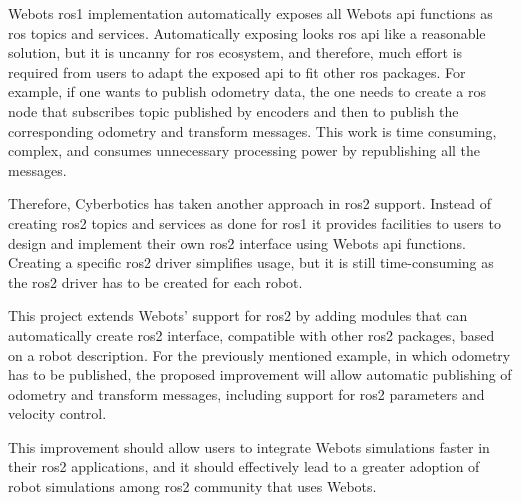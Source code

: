Webots \ac{ros}1 implementation automatically exposes all Webots \ac{api} functions as \ac{ros} topics and services.
Automatically exposing looks \ac{ros} \ac{api} like a reasonable solution, but it is uncanny for \ac{ros} ecosystem, and therefore, much effort is required from users to adapt the exposed \ac{api} to fit other \ac{ros} packages.
For example, if one wants to publish odometry data, the one needs to create a \ac{ros} node that subscribes topic published by encoders and then to publish the corresponding odometry and transform messages. This work is time consuming, complex, and consumes unnecessary processing power by republishing all the messages.

Therefore, Cyberbotics has taken another approach in \ac{ros2} support.
Instead of creating \ac{ros2} topics and services as done for \ac{ros}1 it provides facilities to users to design and implement their own \ac{ros2} interface using Webots \ac{api} functions.
Creating a specific \ac{ros2} driver simplifies usage, but it is still time-consuming as the \ac{ros2} driver has to be created for each robot.

This project extends Webots' support for \ac{ros2} by adding modules that can automatically create \ac{ros2} interface, compatible with other \ac{ros2} packages, based on a robot description.
For the previously mentioned example, in which odometry has to be published, the proposed improvement will allow automatic publishing of odometry and transform messages, including support for \ac{ros2} parameters and velocity control.

This improvement should allow users to integrate Webots simulations faster in their \ac{ros2} applications, and it should effectively lead to a greater adoption of robot simulations among \ac{ros2} community that uses Webots.
